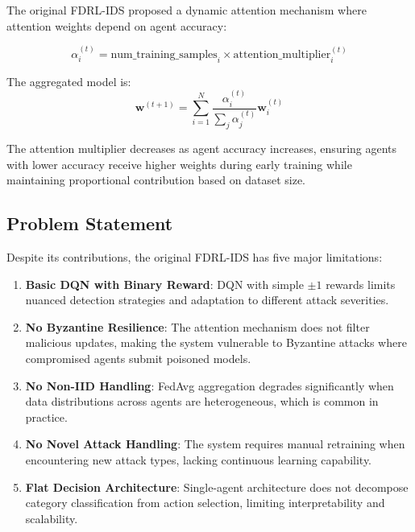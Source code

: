 \documentclass[conference]{IEEEtran}
\begin{document}
The original FDRL-IDS \cite{original_paper} proposed a dynamic attention mechanism where attention weights depend on agent accuracy:

\begin{equation}
\alpha_i^{(t)} = \text{num\_training\_samples}_i \times \text{attention\_multiplier}_i^{(t)}
\end{equation}

The aggregated model is:
\begin{equation}
\mathbf{w}^{(t+1)} = \sum_{i=1}^{N} \frac{\alpha_i^{(t)}}{\sum_j \alpha_j^{(t)}} \mathbf{w}_i^{(t)}
\end{equation}

The attention multiplier decreases as agent accuracy increases, ensuring agents with lower accuracy receive higher weights during early training while maintaining proportional contribution based on dataset size.

\subsection{Problem Statement}

Despite its contributions, the original FDRL-IDS has five major limitations:

\begin{enumerate}
    \item \textbf{Basic DQN with Binary Reward}: DQN with simple $\pm1$ rewards limits nuanced detection strategies and adaptation to different attack severities.

    \item \textbf{No Byzantine Resilience}: The attention mechanism does not filter malicious updates, making the system vulnerable to Byzantine attacks where compromised agents submit poisoned models.

    \item \textbf{No Non-IID Handling}: FedAvg aggregation degrades significantly when data distributions across agents are heterogeneous, which is common in practice.

    \item \textbf{No Novel Attack Handling}: The system requires manual retraining when encountering new attack types, lacking continuous learning capability.

    \item \textbf{Flat Decision Architecture}: Single-agent architecture does not decompose category classification from action selection, limiting interpretability and scalability.
\end{enumerate}
\end{document}
